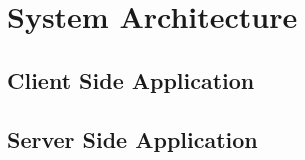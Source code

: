 \section{System Architecture}
\label{sec:SD_SA}



\subsection{Client Side Application}



\subsection{Server Side Application}



